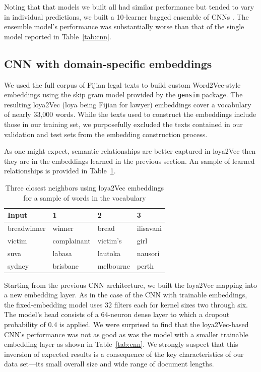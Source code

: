 \documentclass[twocolumn,10pt]{wmrDoc}
\begin{document}
Noting that that models we built all had similar performance but tended to vary in individual predictions, we built a 10-learner bagged ensemble of CNNs \cite{goodfellow}.  The ensemble model's performance was substantially worse than that of the single model reported in Table~\ref{tab:cnn}. 

\subsection{CNN with domain-specific embeddings}
We used the full corpus of Fijian legal texts to build custom Word2Vec-style embeddings using the skip gram model provided by the \verb|gensim| package.  The resulting loya2Vec (loya being Fijian for lawyer) embeddings cover a vocabulary of nearly 33,000 words.  While the texts used to construct the embeddings include those in our training set, we purposefully excluded the texts contained in our validation and test sets from the embedding construction process.

As one might expect, semantic relationships are better captured in loya2Vec then they are in the embeddings learned in the previous section.  An sample of learned relationships is provided in Table~\ref{tab:loya2vec}.

\begin{table}
 \caption{Three closest neighbors using loya2Vec embeddings for a sample of words in the vocabulary}
  \centering
  \begin{tabular}{llll}
    \toprule
    Input       &  1 & 2 & 3\\
    \midrule
    breadwinner &  winner & bread & ilisavani\\
    victim      &  complainant & victim's & girl\\
    suva        &  labasa & lautoka & nausori\\
    sydney      &  brisbane & melbourne & perth\\
    \bottomrule
  \end{tabular}
  \label{tab:loya2vec}
\end{table}

Starting from the previous CNN architecture, we built the loya2Vec mapping into a new embedding layer.  As in the case of the CNN with trainable embeddings, the fixed-embedding model uses 32 filters each for kernel sizes two through six.  The model’s head consists of a 64-neuron dense layer to which a dropout probability of 0.4 is applied.  We were surprised to find that the loya2Vec-based CNN’s performance was not as good as was the model with a smaller trainable embedding layer as shown in Table~\ref{tab:cnn}.  We strongly suspect that this inversion of expected results is a consequence of the key characteristics of our data set---its small overall size and wide range of document lengths.
\end{document}
